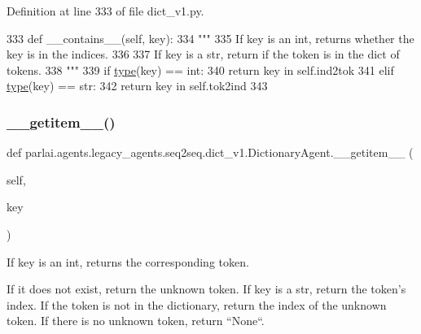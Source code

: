 Definition at line 333 of file dict\+\_\+v1.\+py.


\begin{DoxyCode}
333     \textcolor{keyword}{def }\_\_contains\_\_(self, key):
334         \textcolor{stringliteral}{"""}
335 \textcolor{stringliteral}{        If key is an int, returns whether the key is in the indices.}
336 \textcolor{stringliteral}{}
337 \textcolor{stringliteral}{        If key is a str, return if the token is in the dict of tokens.}
338 \textcolor{stringliteral}{        """}
339         \textcolor{keywordflow}{if} \hyperlink{namespaceparlai_1_1agents_1_1tfidf__retriever_1_1build__tfidf_ad5dfae268e23f506da084a9efb72f619}{type}(key) == int:
340             \textcolor{keywordflow}{return} key \textcolor{keywordflow}{in} self.ind2tok
341         \textcolor{keywordflow}{elif} \hyperlink{namespaceparlai_1_1agents_1_1tfidf__retriever_1_1build__tfidf_ad5dfae268e23f506da084a9efb72f619}{type}(key) == str:
342             \textcolor{keywordflow}{return} key \textcolor{keywordflow}{in} self.tok2ind
343 
\end{DoxyCode}
\mbox{\label{classparlai_1_1agents_1_1legacy__agents_1_1seq2seq_1_1dict__v1_1_1DictionaryAgent_ab9926717ef35f03f16f1329f8ae8edc0}} 
\subsubsection{\texorpdfstring{\+\_\+\+\_\+getitem\+\_\+\+\_\+()}{\_\_getitem\_\_()}}
{\footnotesize\ttfamily def parlai.\+agents.\+legacy\+\_\+agents.\+seq2seq.\+dict\+\_\+v1.\+Dictionary\+Agent.\+\_\+\+\_\+getitem\+\_\+\+\_\+ (\begin{DoxyParamCaption}\item[{}]{self,  }\item[{}]{key }\end{DoxyParamCaption})}

\begin{DoxyVerb}If key is an int, returns the corresponding token.

If it does not exist, return the unknown token. If key is a str, return the
token's index. If the token is not in the dictionary, return the index of the
unknown token. If there is no unknown token, return ``None``.
\end{DoxyVerb}
 

